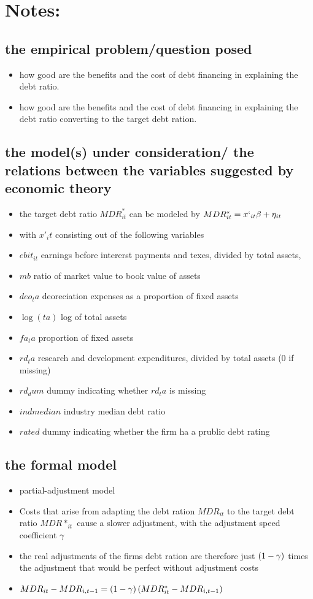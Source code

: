 \documentclass[document.tex]{subfiles}
\begin{document}
\section*{Notes:}
\subsection{ the empirical problem/question posed  }
\begin{itemize}
\item how good are the benefits and the cost of debt financing in explaining the debt ratio.
\item how good are the benefits and the cost of debt financing in explaining the debt ratio converting to the target debt ration.
\end{itemize}
\subsection{ the model(s) under consideration/ the relations between the variables suggested by economic theory  }
\begin{itemize}
\item the target debt ratio $MDR^*_{it}$ can be modeled by $MDR^*_{it} = x`_{it} \beta + \eta_{it}$ 
\item with $x'_it$ consisting out of the following variables
\item $ebit_{it}$  earnings before intererst payments and texes, divided by total assets, 
\item	$mb$ ratio of market value to book value of assets 
 \item $deo_ta$ deoreciation expenses as a proportion of fixed assets 
\item $\log (ta) $ log of total assets 
\item $fa_ta$ proportion of fixed assets
\item $rd_ta$ research and development expenditures, divided by total assets (0 if missing)
\item $rd_dum$ dummy indicating whether $rd_ta$ is missing
\item $indmedian$ industry median debt ratio
\item $rated$ dummy indicating whether the firm ha a prublic debt rating
\end{itemize}
\subsection{ the formal model }
\begin{itemize}
\item partial-adjustment model
\item Costs that arise from adapting the debt ration $MDR_{it}$ to the target debt ratio $MDR*_{it}$ 
cause a slower adjustment, with the adjustment speed coefficient $\gamma$
\item the real adjustments of the firms debt ration are therefore just $\left( 1 - \gamma \right) $ times the adjustment that would be perfect 
without adjustment costs
\item $MDR_{it} - MDR_{i,t-1} = (1-\gamma) \left( MDR^*_{it} - MDR_{i,t-1} \right)$
\end{itemize}
\end{document}
